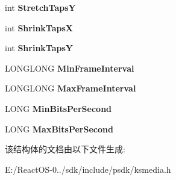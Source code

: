 \begin{DoxyCompactItemize}
int {\bfseries Stretch\+TapsY}
\item 
\mbox{\label{struct___k_s___v_i_d_e_o___s_t_r_e_a_m___c_o_n_f_i_g___c_a_p_s_adc4398e2349022c836b5fc01b4879040}} 
int {\bfseries Shrink\+TapsX}
\item 
\mbox{\label{struct___k_s___v_i_d_e_o___s_t_r_e_a_m___c_o_n_f_i_g___c_a_p_s_a9fa2d1637361961979966e1ee6d4a062}} 
int {\bfseries Shrink\+TapsY}
\item 
\mbox{\label{struct___k_s___v_i_d_e_o___s_t_r_e_a_m___c_o_n_f_i_g___c_a_p_s_aee7856211889b3e991f79161adb4531c}} 
L\+O\+N\+G\+L\+O\+NG {\bfseries Min\+Frame\+Interval}
\item 
\mbox{\label{struct___k_s___v_i_d_e_o___s_t_r_e_a_m___c_o_n_f_i_g___c_a_p_s_a6947276038b68b07d479d70b3d7f0bd4}} 
L\+O\+N\+G\+L\+O\+NG {\bfseries Max\+Frame\+Interval}
\item 
\mbox{\label{struct___k_s___v_i_d_e_o___s_t_r_e_a_m___c_o_n_f_i_g___c_a_p_s_ae5da4bdac7935e547ff32c7d8e17b956}} 
L\+O\+NG {\bfseries Min\+Bits\+Per\+Second}
\item 
\mbox{\label{struct___k_s___v_i_d_e_o___s_t_r_e_a_m___c_o_n_f_i_g___c_a_p_s_a87aef5b8b5161dbea42443193e5c1922}} 
L\+O\+NG {\bfseries Max\+Bits\+Per\+Second}
\end{DoxyCompactItemize}


该结构体的文档由以下文件生成\+:\begin{DoxyCompactItemize}
\item 
E\+:/\+React\+O\+S-\/0../sdk/include/psdk/ksmedia.\+h\end{DoxyCompactItemize}

